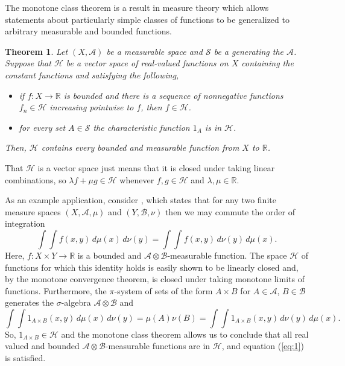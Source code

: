 \documentclass[12pt]{article}
\newtheorem{theorem}{Theorem}
\begin{document}

The monotone class theorem is a result in measure theory which allows statements about particularly simple classes of functions to be generalized to arbitrary measurable and bounded functions.

\begin{theorem}
Let $(X,\mathcal{A})$ be a measurable space and $\mathcal{S}$ be a  generating the  $\mathcal{A}$.
Suppose that $\mathcal{H}$ be a vector space of real-valued functions on $X$ containing the constant functions and satisfying the following,
\begin{itemize}
\item if $f\colon X\rightarrow\mathbb{R}$ is bounded and there is a sequence of nonnegative functions $f_n\in \mathcal{H}$ increasing pointwise to $f$, then $f\in \mathcal{H}$.
\item for every set $A\in\mathcal{S}$ the characteristic function $1_A$ is in $\mathcal{H}$.
\end{itemize}
Then, $\mathcal{H}$ contains every bounded and measurable function from $X$ to $\mathbb{R}$.
\end{theorem}

That $\mathcal{H}$ is a vector space just means that it is closed under taking linear combinations, so $\lambda f+\mu g\in \mathcal{H}$ whenever $f,g\in\mathcal{H}$ and $\lambda,\mu\in\mathbb{R}$.

As an example application, consider , which states that for any two finite measure spaces $(X,\mathcal{A},\mu)$ and $(Y,\mathcal{B},\nu)$ then we may commute the order of integration
\begin{equation}\label{eq:1}
\int\int f(x,y)\,d\mu(x)\,d\nu(y)=\int\int f(x,y)\,d\nu(y)\,d\mu(x).
\end{equation}
Here, $f\colon X\times Y\rightarrow\mathbb{R}$ is a bounded and $\mathcal{A}\otimes\mathcal{B}$-measurable function. The space $\mathcal{H}$ of functions for which this identity holds is easily shown to be linearly closed and, by the monotone convergence theorem, is closed under taking monotone limits of functions. Furthermore, the $\pi$-system of sets of the form $A\times B$ for $A\in\mathcal{A}$, $B\in\mathcal{B}$ generates the $\sigma$-algebra $\mathcal{A}\otimes\mathcal{B}$ and
\begin{equation*}
\int\int 1_{A\times B}(x,y)\,d\mu(x)\,d\nu(y)=\mu(A)\nu(B)=\int\int 1_{A\times B}(x,y)\,d\nu(y)\,d\mu(x).
\end{equation*}
So, $1_{A\times B}\in \mathcal{H}$ and the monotone class theorem allows us to conclude that all real valued and bounded $\mathcal{A}\otimes\mathcal{B}$-measurable functions are in $\mathcal{H}$, and equation (\ref{eq:1}) is satisfied.
\end{document}
